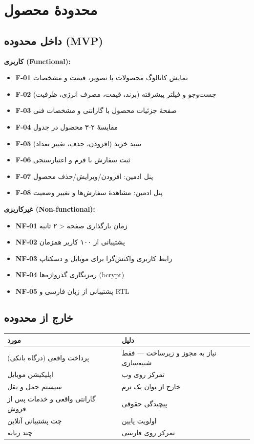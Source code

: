 \documentclass[12pt, a4paper]{article}
\begin{document}
\section{محدودهٔ محصول}

\subsection{داخل محدوده (MVP)}

\textbf{کاربری (Functional):}
\begin{itemize}
    \item \textbf{F-01} نمایش کاتالوگ محصولات با تصویر، قیمت و مشخصات
    \item \textbf{F-02} جست‌وجو و فیلتر پیشرفته (برند، قیمت، مصرف انرژی، ظرفیت)
    \item \textbf{F-03} صفحهٔ جزئیات محصول با گارانتی و مشخصات فنی
    \item \textbf{F-04} مقایسهٔ ۲-۳ محصول در جدول
    \item \textbf{F-05} سبد خرید (افزودن، حذف، تغییر تعداد)
    \item \textbf{F-06} ثبت سفارش با فرم و اعتبارسنجی
    \item \textbf{F-07} پنل ادمین: افزودن/ویرایش/حذف محصول
    \item \textbf{F-08} پنل ادمین: مشاهدهٔ سفارش‌ها و تغییر وضعیت
\end{itemize}

\textbf{غیرکاربری (Non-functional):}
\begin{itemize}
    \item \textbf{NF-01} زمان بارگذاری صفحه < ۲ ثانیه
    \item \textbf{NF-02} پشتیبانی از ۱۰۰ کاربر همزمان
    \item \textbf{NF-03} رابط کاربری واکنش‌گرا برای موبایل و دسکتاپ
    \item \textbf{NF-04} رمزنگاری گذرواژه‌ها (bcrypt)
    \item \textbf{NF-05} پشتیبانی از زبان فارسی و RTL
\end{itemize}

\subsection{خارج از محدوده}
\begin{center}
\begin{tabular}{|l|p{8cm}|}
\hline
\textbf{مورد} & \textbf{دلیل} \\
\hline
پرداخت واقعی (درگاه بانکی) & نیاز به مجوز و زیرساخت — فقط شبیه‌سازی \\
\hline
اپلیکیشن موبایل & تمرکز روی وب \\
\hline
سیستم حمل و نقل & خارج از توان یک ترم \\
\hline
گارانتی واقعی و خدمات پس از فروش & پیچیدگی حقوقی \\
\hline
چت پشتیبانی آنلاین & اولویت پایین \\
\hline
چند زبانه & تمرکز روی فارسی \\
\hline
\end{tabular}
\end{center}
\end{document}

